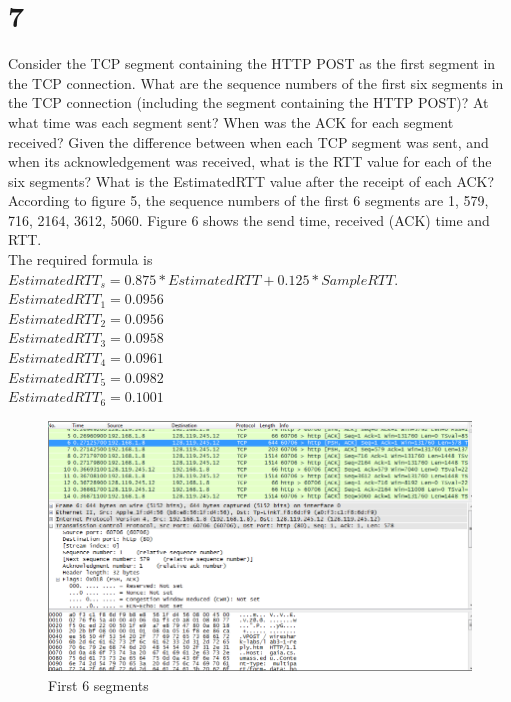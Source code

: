 \documentclass{article}
\begin{document}
\section*{7}
Consider the TCP segment containing the HTTP POST as the first segment in the
TCP connection. What are the sequence numbers of the first six segments in the TCP connection (including the segment containing the HTTP POST)? At what
time was each segment sent? When was the ACK for each segment received? Given the difference between when each TCP segment was sent, and when its acknowledgement was received, what is the RTT value for each of the six segments? What is the EstimatedRTT value after the receipt of each ACK?\\
\newline According to figure 5, the sequence numbers of the first 6 segments are 1, 579, 716, 2164, 3612, 5060.  Figure 6 shows the send time, received (ACK) time and RTT.\\
\newline The required formula is $EstimatedRTT_s = 0.875 * EstimatedRTT + 0.125 * SampleRTT$.\\
\newline $EstimatedRTT_1 = 0.0956$\\
\newline $EstimatedRTT_2 = 0.0956$\\
\newline $EstimatedRTT_3 = 0.0958$\\
\newline $EstimatedRTT_4 = 0.0961$\\
\newline $EstimatedRTT_5 = 0.0982$\\
\newline $EstimatedRTT_6 = 0.1001$\\
\clearpage
\begin{figure}[h!]
\centering
\includegraphics[scale=0.4]{Q7a.png}
\caption{First 6 segments}
\end{figure}
\end{document}
